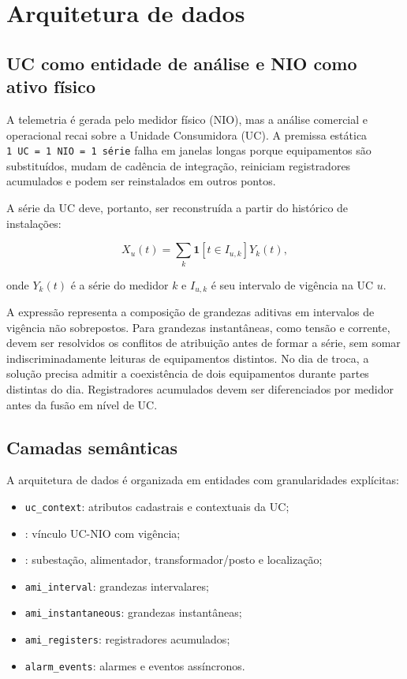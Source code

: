 \chapter{Arquitetura de dados}\label{arquitetura-de-dados}

\section{UC como entidade de análise e NIO como ativo físico}\label{uc-como-entidade-de-anuxe1lise-e-nio-como-ativo-fuxedsico}

A telemetria é gerada pelo medidor físico (NIO), mas a análise comercial e operacional recai sobre a Unidade Consumidora (UC). A premissa estática \texttt{1~UC~=~1~NIO~=~1~série} falha em janelas longas porque equipamentos são substituídos, mudam de cadência de integração, reiniciam registradores acumulados e podem ser reinstalados em outros pontos.

A série da UC deve, portanto, ser reconstruída a partir do histórico de instalações:

\[X_u(t)=\sum_k \mathbf{1}[t\in I_{u,k}]Y_k(t),\]

onde \(Y_k(t)\) é a série do medidor \(k\) e \(I_{u,k}\) é seu intervalo de vigência na UC \(u\).

A expressão representa a composição de grandezas aditivas em intervalos de vigência não sobrepostos. Para grandezas instantâneas, como tensão e corrente, devem ser resolvidos os conflitos de atribuição antes de formar a série, sem somar indiscriminadamente leituras de equipamentos distintos. No dia de troca, a solução precisa admitir a coexistência de dois equipamentos durante partes distintas do dia. Registradores acumulados devem ser diferenciados por medidor antes da fusão em nível de UC.

\section{Camadas semânticas}\label{camadas-semuxe2nticas}

A arquitetura de dados é organizada em entidades com granularidades explícitas:

\begin{itemize}
\item
  \texttt{uc\_context}: atributos cadastrais e contextuais da UC;
\item
  : vínculo UC-NIO com vigência;
\item
  : subestação, alimentador, transformador/posto e localização;
\item
  \texttt{ami\_interval}: grandezas intervalares;
\item
  \texttt{ami\_instantaneous}: grandezas instantâneas;
\item
  \texttt{ami\_registers}: registradores acumulados;
\item
  \texttt{alarm\_events}: alarmes e eventos assíncronos.
\end{itemize}

